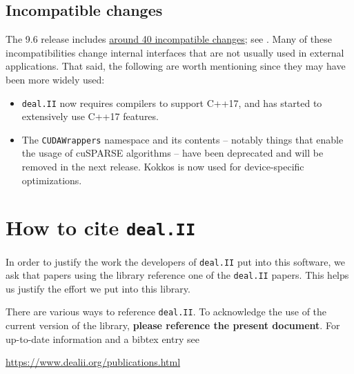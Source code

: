 \documentclass{ansarticle-preprint}
\newcommand{\specialword}[1]{\texttt{#1}}
\newcommand{\dealii}{{\specialword{deal.II}}\xspace}
\begin{document}
\subsection{Incompatible changes}\label{subsec:deprecated}

The 9.6 release includes
\href{https://dealii.org/developer/doxygen/deal.II/changes_between_9_5_2_and_9_6_0.html}
     {around 40 incompatible changes};
see \cite{changes96}. Many of these
incompatibilities change internal
interfaces that are not usually used in external
applications. That said, the following are worth mentioning since they
may have been more widely used:
\begin{itemize}
  \item \dealii{} now requires compilers to support C++17, and has
    started to extensively use C++17 features.
  \item The \texttt{CUDAWrappers} namespace and its contents --
    notably things that enable the usage of cuSPARSE algorithms --
    have been deprecated and will be removed in the next
    release. Kokkos is now used for device-specific optimizations.
\end{itemize}



\section{How to cite \dealii}\label{sec:cite}

In order to justify the work the developers of \dealii put into this
software, we ask that papers using the library reference one of the
\dealii papers. This helps us justify the effort we put into this library.

There are various ways to reference \dealii. To acknowledge the use of
the current version of the library, \textbf{please reference the present
  document}. For up-to-date information and a bibtex entry
see
\begin{center}
  \url{https://www.dealii.org/publications.html}
\end{center}
\end{document}
